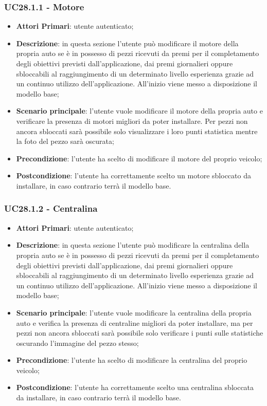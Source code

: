 \subsubsection{UC28.1.1 - Motore}
\begin{itemize}
	\item \textbf{Attori Primari}: utente autenticato;
	\item \textbf{Descrizione}: in questa sezione l'utente può modificare il motore della propria auto se è in possesso di pezzi ricevuti da premi per il completamento degli obiettivi previsti dall'applicazione, dai premi giornalieri oppure sbloccabili al raggiungimento di un determinato livello esperienza grazie ad un continuo utilizzo dell'applicazione.
	All'inizio viene messo a disposizione il modello base;
	\item \textbf{Scenario principale}: l'utente vuole modificare il motore della propria auto e verificare la presenza di motori migliori da poter installare. Per pezzi non ancora sbloccati sarà possibile solo visualizzare i loro punti statistica mentre la foto del pezzo sarà oscurata;
	\item \textbf{Precondizione}: l'utente ha scelto di modificare il motore del proprio veicolo; 
	\item \textbf{Postcondizione}: l'utente ha correttamente scelto un motore sbloccato da installare, in caso contrario terrà il modello base.
\end{itemize}
\subsubsection{UC28.1.2 - Centralina}
\begin{itemize}
	\item \textbf{Attori Primari}: utente autenticato;
	\item \textbf{Descrizione}: in questa sezione l'utente può modificare la centralina della propria auto se è in possesso di pezzi ricevuti da premi per il completamento degli obiettivi previsti dall'applicazione, dai premi giornalieri oppure sbloccabili al raggiungimento di un determinato livello esperienza grazie ad un continuo utilizzo dell'applicazione.
	All'inizio viene messo a disposizione il modello base;
	\item \textbf{Scenario principale}: l'utente vuole modificare la centralina della propria auto e verifica la presenza di centraline migliori da poter installare, ma per pezzi non ancora sbloccati sarà possibile solo verificare i punti sulle statistiche oscurando l'immagine del pezzo stesso;
	\item \textbf{Precondizione}: l'utente ha scelto di modificare la centralina del proprio veicolo; 
	\item \textbf{Postcondizione}: l'utente ha correttamente scelto una centralina sbloccata da installare, in caso contrario terrà il modello base.
\end{itemize}
